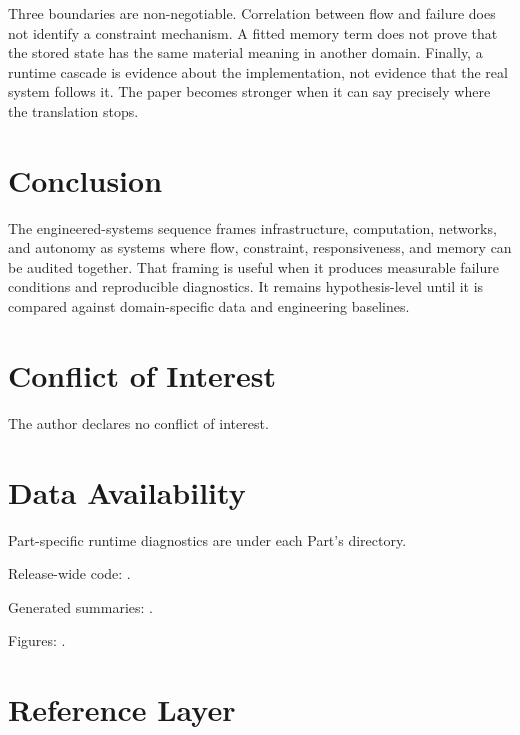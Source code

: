 \documentclass[12pt,a4paper]{article}
\begin{document}
Three boundaries are non-negotiable. Correlation between flow and failure does
not identify a constraint mechanism. A fitted memory term does not prove that
the stored state has the same material meaning in another domain. Finally, a
runtime cascade is evidence about the implementation, not evidence that the
real system follows it. The paper becomes stronger when it can say precisely
where the translation stops.



\section{Conclusion}

The engineered-systems sequence frames infrastructure, computation, networks,
and autonomy as systems where flow, constraint, responsiveness, and memory can
be audited together. That framing is useful when it produces measurable failure
conditions and reproducible diagnostics. It remains hypothesis-level until it
is compared against domain-specific data and engineering baselines.

\section*{Conflict of Interest}
The author declares no conflict of interest.

\section*{Data Availability}
Part-specific runtime diagnostics are under each Part's  directory.

Release-wide code: .

Generated summaries: .

Figures: .


\section{Reference Layer}


\end{document}
